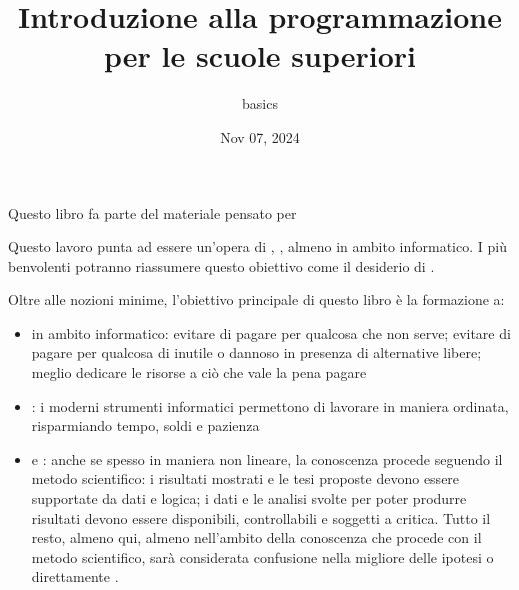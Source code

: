\documentclass[letterpaper,10pt,english]{jupyterBook}
\title{Introduzione alla programmazione per le scuole superiori}
\date{Nov 07, 2024}
\author{basics}
\begin{document}
\pagestyle{empty}
\sphinxmaketitle
\pagestyle{plain}
\sphinxtableofcontents
\pagestyle{normal}
\label{\detokenize{intro::doc}}


\sphinxAtStartPar
Questo libro fa parte del materiale pensato per 

\sphinxAtStartPar
{} Questo lavoro punta ad essere un’opera di  ,   , almeno in ambito informatico. I più benvolenti potranno riassumere questo obiettivo come il desiderio di .

\sphinxAtStartPar
Oltre alle nozioni minime, l’obiettivo principale di questo libro è la formazione a:
\begin{itemize}
\item {} 
\sphinxAtStartPar
{} in ambito informatico: evitare di pagare per qualcosa che non serve; evitare di pagare per qualcosa di inutile o dannoso in presenza di alternative libere; meglio dedicare le risorse a ciò che vale la pena pagare

\item {} 
\sphinxAtStartPar
{}: i moderni strumenti informatici permettono di lavorare in maniera ordinata, risparmiando tempo, soldi e pazienza

\item {} 
\sphinxAtStartPar
{} e : anche se spesso in maniera non lineare, la conoscenza procede seguendo il metodo scientifico: i risultati mostrati e le tesi proposte devono essere supportate da dati e logica; i dati e le analisi svolte per poter produrre risultati devono essere disponibili, controllabili e soggetti a critica. Tutto il resto, almeno qui, almeno nell’ambito della conoscenza che procede con il metodo scientifico, sarà considerata confusione nella migliore delle ipotesi o direttamente .

\end{itemize}
\end{document}
